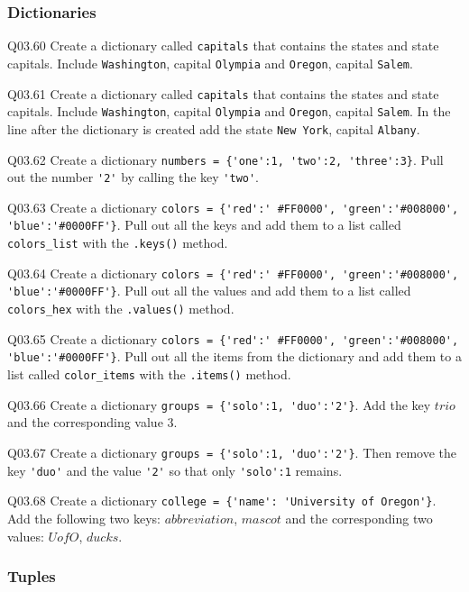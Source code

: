 \documentclass{book}
\begin{document}
    
        \subsubsection{Dictionaries}\label{dictionaries}

Q03.60 Create a dictionary called \lstinline!capitals! that contains the
states and state capitals. Include \lstinline!Washington!, capital
\lstinline!Olympia! and \lstinline!Oregon!, capital \lstinline!Salem!.

Q03.61 Create a dictionary called \lstinline!capitals! that contains the
states and state capitals. Include \lstinline!Washington!, capital
\lstinline!Olympia! and \lstinline!Oregon!, capital \lstinline!Salem!.
In the line after the dictionary is created add the state
\lstinline!New York!, capital \lstinline!Albany!.

Q03.62 Create a dictionary
\lstinline!numbers = {'one':1, 'two':2, 'three':3}!. Pull out the number
\lstinline!'2'! by calling the key \lstinline!'two'!.

Q03.63 Create a dictionary
\lstinline!colors = {'red':' #FF0000', 'green':'#008000', 'blue':'#0000FF'}!.
Pull out all the keys and add them to a list called
\lstinline!colors_list! with the \lstinline!.keys()! method.

Q03.64 Create a dictionary
\lstinline!colors = {'red':' #FF0000', 'green':'#008000', 'blue':'#0000FF'}!.
Pull out all the values and add them to a list called
\lstinline!colors_hex! with the \lstinline!.values()! method.

Q03.65 Create a dictionary
\lstinline!colors = {'red':' #FF0000', 'green':'#008000', 'blue':'#0000FF'}!.
Pull out all the items from the dictionary and add them to a list called
\lstinline!color_items! with the \lstinline!.items()! method.

Q03.66 Create a dictionary \lstinline!groups = {'solo':1, 'duo':'2'}!.
Add the key \(trio\) and the corresponding value \(3\).

Q03.67 Create a dictionary \lstinline!groups = {'solo':1, 'duo':'2'}!.
Then remove the key \lstinline!'duo'! and the value \lstinline!'2'! so
that only \lstinline!'solo':1! remains.

Q03.68 Create a dictionary
\lstinline!college = {'name': 'University of Oregon'}!. Add the
following two keys: \(abbreviation\), \(mascot\) and the corresponding
two values: \(UofO\), \(ducks\).
    




    
        \subsubsection{Tuples}\label{tuples}
\end{document}
